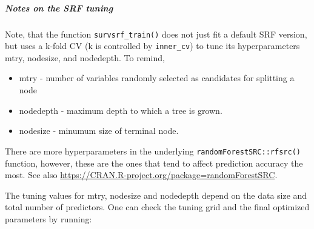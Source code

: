 \documentclass[
]{article}
\newenvironment{Shaded}{\begin{snugshade}}{\end{snugshade}}
\newcommand{\CommentTok}[1]{\textcolor[rgb]{0.56,0.35,0.01}{\textit{#1}}}
\newcommand{\FunctionTok}[1]{\textcolor[rgb]{0.13,0.29,0.53}{\textbf{#1}}}
\newcommand{\NormalTok}[1]{#1}
\newcommand{\SpecialCharTok}[1]{\textcolor[rgb]{0.81,0.36,0.00}{\textbf{#1}}}
\providecommand{\tightlist}{%
  \setlength{\itemsep}{0pt}\setlength{\parskip}{0pt}}
\begin{document}
\hypertarget{notes-on-the-srf-tuning}{%
\subparagraph{Notes on the SRF tuning}\label{notes-on-the-srf-tuning}}

Note, that the function \texttt{survsrf\_train()} does not just fit a
default SRF version, but uses a k-fold CV (k is controlled by
\texttt{inner\_cv}) to tune its hyperparameters mtry, nodesize, and
nodedepth. To remind,

\begin{itemize}
\tightlist
\item
  mtry - number of variables randomly selected as candidates for
  splitting a node
\item
  nodedepth - maximum depth to which a tree is grown.
\item
  nodesize - minumum size of terminal node.
\end{itemize}

There are more hyperparameters in the underlying
\texttt{randomForestSRC::rfsrc()} function, however, these are the ones
that tend to affect prediction accuracy the most. See also
\url{https://CRAN.R-project.org/package=randomForestSRC}.

The tuning values for mtry, nodesize and nodedepth depend on the data
size and total number of predictors. One can check the tuning grid and
the final optimized parameters by running:

\begin{Shaded}
\end{Shaded}
\end{document}
